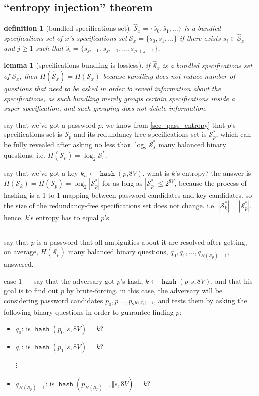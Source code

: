 \documentclass[twocolumn]{article}
\newtheorem{definition}{definition}
\newtheorem{lemma}{lemma}
\DeclareMathOperator{\hash}{\mathtt{hash}}
\begin{document}
\subsection{``entropy injection'' theorem}
\begin{definition}[bundled specifications set]
    $\mathcal{\hat S}_x = \{\hat s_0, \hat s_1, \ldots\}$ is a bundled
    specifications set of $x$'s specifications set $\mathcal{S}_x = \{s_0,
    s_1, \ldots\}$ if there exists $\hat s_i \in \mathcal{\hat S}_x$ and $j
    \ge 1$ such that $\hat s_i = \{s_{ji+0}, s_{ji+1}, \ldots,
    s_{ji+j-1}\}$.
\end{definition}

\begin{lemma}[specifications bundling is lossless]
    if $\mathcal{\hat S}_x$ is a bundled specifications set of
    $\mathcal{S}_x$, then $H(\mathcal{\hat S}_x) = H(\mathcal{S}_x)$
    because bundling does not reduce number of questions that need to be
    asked in order to reveal information about the specifications, as such
    bundling merely groups certain specifications inside a
    super-specification, and such grouping does not delete information.
\end{lemma}

say that we've got a password $p$.  we know from \cref{sec_pass_entropy}
that $p$'s specifications set is $\mathcal{S}_p$ and its redundancy-free
specifications set is $\mathcal{S}_p^*$, which can be fully revealed after
asking no less than $\log_2 \mathcal{S}_s^*$ many balanced binary
questions.  i.e. $H(\mathcal{S}_p) = \log_2 \mathcal{S}_s^*$.

say that we've got a key $k_h \gets \hash(p, 8V)$.  what is $k$'s entropy?
the answer is $H(\mathcal{S}_k) = H(\mathcal{S}_p) = \log_2
|\mathcal{S}_p^*|$ for as long as $|\mathcal{S}_p^*| \le 2^{8V}$, because
the process of hashing is a 1-to-1 mapping between password candidates and
key candidates.  so the size of the redundancy-free specifications set does
not change.  i.e.  $|\mathcal{S}_k^*| = |\mathcal{S}_p^*|$.  hence, $k$'s
entropy has to equal $p$'s.

\hrule

say that $p$ is a password that all ambiguities about it are resolved after
getting, on average, $H(\mathcal{S}_p)$ many balanced binary questions,
$q_0, q_1, \ldots, q_{H(\mathcal{S}_p)-1}$, answered.

case 1 --- say that the adversary got $p$'s hash, $k \gets \hash(p \Vert s,
8V)$, and that his goal is to find out $p$ by brute-forcing.  in this case,
the adversary will be considering password candidates $p_0, p_, \ldots,
p_{2^{H(\mathcal{S}_p)-1}}$, and tests them by asking the following binary
questions in order to guarantee finding $p$:
\begin{itemize}
    \item $q_0$: is $\hash(p_0 \Vert s, 8V) = k$?
    \item $q_1$: is $\hash(p_1 \Vert s, 8V) = k$?

    $\vdots$

    \item $q_{H(\mathcal{S}_p)-1}$: is $\hash(p_{H(\mathcal{S}_p)-1} \Vert
    s, 8V) = k$?
\end{itemize}
\end{document}
